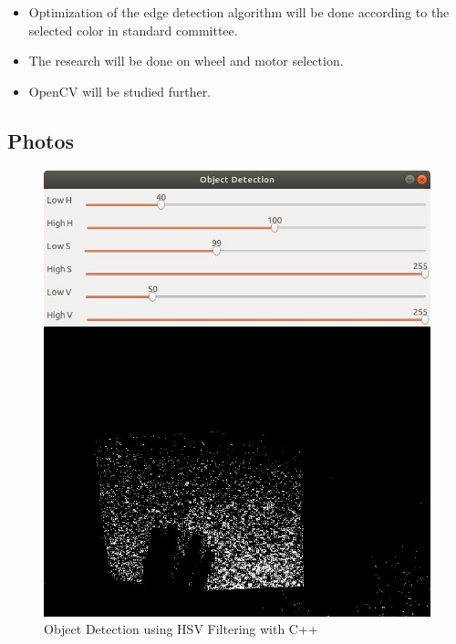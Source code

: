 \documentclass[a4paper,12pt]{article}
\begin{document}
	\begin{itemize}
		\item Optimization of the edge detection algorithm will be done according to the selected color in standard committee.
		\item The research will be done on wheel and motor selection.
		\item OpenCV will be studied further.
		
		
	\end{itemize}




\begin{appendices}
\section{Photos}

\begin{figure}[H]
\center
\setlength{\unitlength}{\textwidth} 
\includegraphics[width=0.7\unitlength]{0}
\caption{\label{fig:logo} Object Detection using HSV Filtering with C++  }
\end{figure}



\end{appendices}
\end{document}
